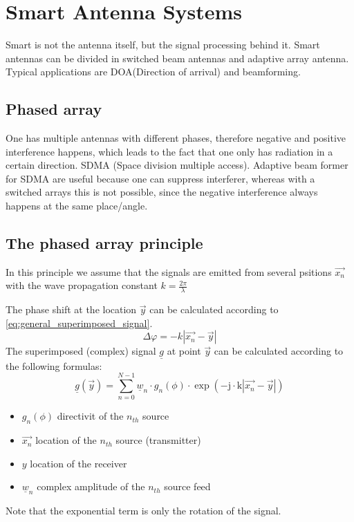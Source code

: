 \section{Smart Antenna Systems}
Smart is not the antenna itself, but the signal processing behind it. Smart antennas can be divided in switched beam antennas and adaptive array antenna. Typical applications are DOA(Direction of arrival) and beamforming.
\subsection{Phased array}
One has multiple antennas with different phases, therefore negative and positive interference happens, which leads to the fact that one only has radiation in a certain direction. SDMA (Space division multiple access). Adaptive beam former for SDMA are useful because one can suppress interferer, whereas with a switched arrays this is not possible, since the negative interference always happens at the same place/angle.
\subsection{The phased array principle}
In this principle we assume that the signals are emitted from several psitions $\overrightarrow{x_n}$ with the wave propagation constant $k=\frac{2\pi}{\lambda}$

The phase shift at the location $\overrightarrow{y}$ can be calculated according to \autoref{eq:general_superimposed_signal}.
\begin{equation}\label{eq:general_superimposed_signal}
\Delta \varphi=-k\left|\overrightarrow{x_n}-\vec{y}\right|
\end{equation}
The superimposed (complex) signal $\underline{g}$ at point $\overrightarrow{y}$ can be calculated according to the following formulas:
\begin{equation}\label{eq:superimposed_complex_signal}
\underline{g}(\vec{y})=\sum_{n=0}^{N-1} \underline{w}_n \cdot g_n(\phi) \cdot \exp \left(-\mathrm{j} \cdot \mathrm{k}\left|\overrightarrow{x_n}-\vec{y}\right|\right)
\end{equation}
\begin{itemize}
    \item $g_n(\phi)$ directivit of the $n_{th}$ source
    \item $\overrightarrow{x_n}$ location of the $n_{th}$ source (transmitter)
    \item $y$ location of the receiver
    \item $\underline{w}_n$ complex amplitude of the $n_{th}$ source feed
\end{itemize}
Note that the exponential term is only the rotation of the signal.
